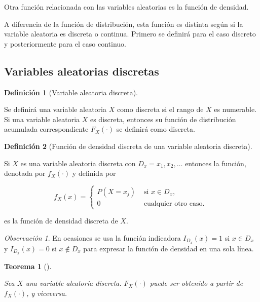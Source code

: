 \documentclass[
  us-letterpaper,
]{scrreprt}
\theoremstyle{plain}
\newtheorem{theorem}{Teorema}[chapter]
\theoremstyle{definition}
\newtheorem{definition}{Definición}[chapter]
\theoremstyle{definition}
\theoremstyle{plain}
\theoremstyle{remark}
\newtheorem*{remark}{Observación}
\begin{document}
Otra función relacionada con las variables aleatorias es la función de
densidad.

A diferencia de la función de distribución, esta función es distinta
según si la variable aleatoria es discreta o continua. Primero se
definirá para el caso discreto y posteriormente para el caso continuo.

\subsection{Variables aleatorias
discretas}\label{variables-aleatorias-discretas}

\begin{definition}[Variable aleatoria
discreta]\protect\hypertarget{def-vad}{}\label{def-vad}

Se definirá una variable aleatoria \(X\) como discreta si el rango de
\(X\) es numerable. Si una variable aleatoria \(X\) es discreta,
entonces su función de distribución acumulada correspondiente
\(F_X(\cdot)\) se definirá como discreta.

\end{definition}

\begin{definition}[Función de densidad discreta de una variable
aleatoria discreta]\protect\hypertarget{def-fdd}{}\label{def-fdd}

Si \(X\) es una variable aleatoria discreta con \(D_x=x_1,x_2,\ldots\)
entonces la función, denotada por \(f_X(\cdot)\) y definida por

\[ f_X(x)=\begin{cases}P(X=x_j) & \text{ si } x\in D_x,\\ 0 & \text{ cualquier otro caso. }\end{cases} \]

es la función de densidad discreta de \(X\).

\end{definition}

\begin{remark}
En ocasiones se usa la función indicadora \(I_{D_x}(x)=1\) si
\(x\in D_x\) y \(I_{D_x}(x)=0\) si \(x\notin D_x\) para expresar la
función de densidad en una sola línea.
\end{remark}

\begin{theorem}[]\protect\hypertarget{thm-uno}{}\label{thm-uno}

Sea \(X\) una variable aleatoria discreta. \(F_X(\cdot)\) puede ser
obtenido a partir de \(f_X(\cdot)\), y viceversa.

\end{theorem}
\end{document}
